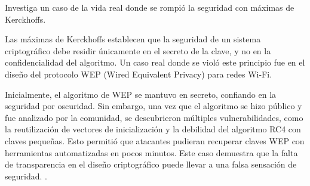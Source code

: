 Investiga un caso de la vida real donde se rompió la seguridad con máximas de Kerckhoffs.

Las máximas de Kerckhoffs establecen que la seguridad de un sistema criptográfico debe residir únicamente en el secreto de la clave, y no en la confidencialidad del algoritmo. Un caso real donde se violó este principio fue en el diseño del protocolo WEP (Wired Equivalent Privacy) para redes Wi-Fi.

Inicialmente, el algoritmo de WEP se mantuvo en secreto, confiando en la seguridad por oscuridad. Sin embargo, una vez que el algoritmo se hizo público y fue analizado por la comunidad, se descubrieron múltiples vulnerabilidades, como la reutilización de vectores de inicialización y la debilidad del algoritmo RC4 con claves pequeñas. Esto permitió que atacantes pudieran recuperar claves WEP con herramientas automatizadas en pocos minutos. Este caso demuestra que la falta de transparencia en el diseño criptográfico puede llevar a una falsa sensación de seguridad. \cite{michael_kerckhoffs}.